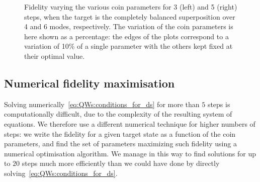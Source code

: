 \begin{figure}[]
    \centering
    \begin{minipage}[b]{0.5\textwidth}
    \end{minipage}%
    \begin{minipage}[b]{0.5\textwidth}
    \end{minipage}
    \caption{
        Fidelity varying the various coin parameters for 3 (left) and 5 (right) steps, when the target is the completely balanced superposition over 4 and 6 modes, respectively.
        The variation of the coin parameters is here shown as a percentage: the edges of the plots correspond to a variation of 10\% of a single parameter with the others kept fixed at their optimal value.
    }
    \label{fig:stabilities_3and5steps_balanced_target}
\end{figure}

\FloatBarrier
\subsection{Numerical fidelity maximisation}
\label{sec:QWs:numerical_fid_max}

Solving numerically~\cref{eq:QWs:conditions_for_ds} for more than $5$ steps is computationally difficult, due to the complexity of the resulting system of equations.
We therefore use a different numerical technique for higher numbers of steps:
we write the fidelity for a given target state as a function of the coin parameters, and find the set of parameters maximizing such fidelity using a numerical optimisation algorithm.
We manage in this way to find solutions for up to $20$ steps much more efficiently than we could have done by directly solving~\cref{eq:QWs:conditions_for_ds}.


